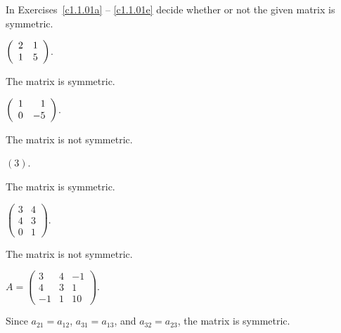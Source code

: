 \documentclass{ximera}
\begin{document}
\noindent In Exercises~\ref{c1.1.01a} -- \ref{c1.1.01e} decide whether or
not the given matrix is symmetric.
\begin{exercise} \label{c1.1.01a}
  $\left(\begin{array}{rr} 2 & 1\\ 1 &5\end{array}\right)$.

\begin{solution}
\ans The matrix is symmetric.

\end{solution}
\end{exercise}

\begin{exercise} \label{c1.1.01b}
  $\left(\begin{array}{rr} 1 & 1\\ 0 &-5\end{array}\right)$.

\begin{solution}
\ans The matrix is not symmetric.

\end{solution}
\end{exercise}

\begin{exercise} \label{c1.1.01c}
  $(3)$.

\begin{solution}
\ans The matrix is symmetric.

\end{solution}
\end{exercise}

\begin{exercise} \label{c1.1.01d}
  $\left( \begin{array}{rr}
            3 & 4 \\
            4 & 3 \\
            0 & 1 \end{array} \right)$.

\begin{solution}
\ans The matrix is not symmetric.

\end{solution}
\end{exercise}

\begin{exercise} \label{c1.1.01e}
 $A = \left( \begin{array}{rrr}
 3 & 4 & -1\\
 4 & 3 &  1\\
 -1 & 1 & 10\end{array} \right)$.
       

\begin{solution}
\ans Since $a_{21} = a_{12}$, $a_{31} = a_{13}$, and $a_{32} = a_{23}$, the matrix is symmetric.

\end{solution}
\end{exercise}
\end{document}

